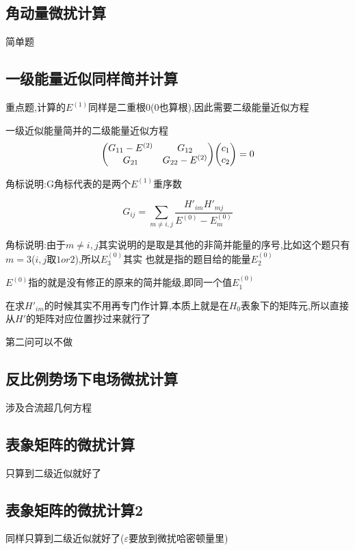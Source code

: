 \documentclass{article}
\begin{document}
        \subsection{角动量微扰计算}
            简单题

        \subsection{一级能量近似同样简并计算}
            重点题,计算的$E^{(1)}$同样是二重根$0$(0也算根),因此需要二级能量近似方程

            \begin{formal}
                一级近似能量简并的二级能量近似方程
                $$
                \mqty(G_{11}-E^{(2)} & G_{12} \\ G_{21} & G_{22}-E^{(2)}) \mqty(c_{1} \\ c_{2}) = 0
                $$

                角标说明:G角标代表的是两个$E^{(1)}$重序数

                $$
                G_{ij} = \sum\limits_{m \neq i,j} \dfrac{H'_{im} H'_{mj}}{E^{(0)} - E_{m}^{(0)}}
                $$

                角标说明:由于$m \neq i,j$其实说明的是取是其他的非简并能量的序号,比如这个题只有$m=3$($i,j$取$1or2$),所以$E_{3}^{(0)}$其实
                也就是指的题目给的能量$E_{2}^{(0)}$

                $ E^{(0)} $指的就是没有修正的原来的简并能级,即同一个值$E_{1}^{(0)}$

                在求$H'_{im}$的时候其实不用再专门作计算,本质上就是在$H_{0}$表象下的矩阵元,所以直接从$H'$的矩阵对应位置抄过来就行了

            \end{formal}  

            第二问可以不做
        \subsection{反比例势场下电场微扰计算}
            涉及合流超几何方程
        
        \subsection{表象矩阵的微扰计算}
            只算到二级近似就好了 
        
        \subsection{表象矩阵的微扰计算2}
            同样只算到二级近似就好了($\varepsilon$要放到微扰哈密顿量里)
        
\end{document}
